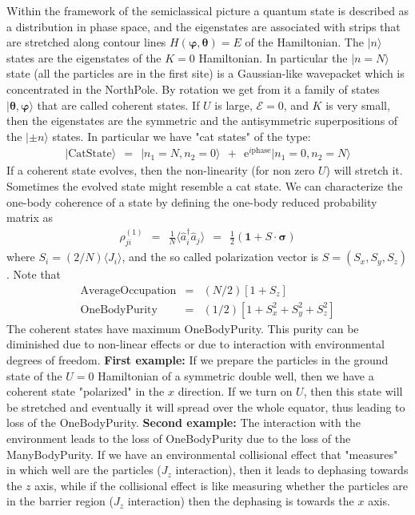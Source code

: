 \documentclass[onecolumn,fleqn, 11pt]{revtex4}
\newcommand{\eexp}{\mathrm{e}^}
\newcommand{\varphiJ}{\bm{\varphi}}
\newcommand{\thetaJ}{\bm{\theta}}
\newcommand{\beq}{\begin{eqnarray}}
\newcommand{\eeq}{\end{eqnarray}}
\begin{document}
Within the framework of the semiclassical picture 
a quantum state is described as a distribution 
in phase space, and the eigenstates are associated 
with strips that are stretched along 
contour lines ${H(\varphiJ,\thetaJ)=E}$ of the Hamiltonian. 
The $|n\rangle$ states are the eigenstates of the $K=0$ Hamiltonian. 
In particular the ${|n{=}N\rangle}$ state (all the particles are in the first site) 
is a Gaussian-like wavepacket which is concentrated in the NorthPole. 
By rotation we get from it a family of states ${|\thetaJ,\varphiJ\rangle}$
that are called coherent states. 
If $U$ is large, $\mathcal{E}=0$, and $K$ is very small, 
then the eigenstates are the symmetric and the antisymmetric 
superpositions of the $|\pm n\rangle$ states.  
In particular we have "cat states" of the type:
\beq
| \mbox{CatState} \rangle \ \ = \ \ |n_1{=}N,n_2{=}0\rangle \ \ + \ \ \eexp{i\mbox{phase}} |n_1{=}0,n_2{=}N\rangle 
\eeq
If a coherent state evolves, then the non-linearity (for non zero $U$) 
will stretch it. Sometimes the evolved state might resemble a cat state.
We can characterize the one-body coherence of a state 
by defining the one-body reduced probability matrix as 
\beq
\rho^{(1)}_{ji} 
\ \ = \ \  \frac{1}{N}\langle \hat{a}_i^{\dagger} \hat{a}_j \rangle   
\ \ = \ \  \frac{1}{2}(\bm{1} +  S \cdot \bm{\sigma}) 
\eeq
where  ${S_i=(2/N)\langle J_i \rangle}$, and the so called polarization vector 
is ${S = ( S_x,  S_y, S_z)}$. Note that
\beq
\mbox{AverageOccupation} &=& (N/2)\left[ 1 + S_z \right]
\\
\mbox{OneBodyPurity} &=&  (1/2) \left[ 1 + S_x^2 + S_y^2 + S_z^2 \right]
\eeq
The coherent states have maximum OneBodyPurity. 
This purity can be diminished due to 
non-linear effects or due to interaction 
with environmental degrees of freedom.  
{\bf First example:} 
If we prepare the particles in the ground state 
of the ${U=0}$ Hamiltonian of a symmetric double well, 
then we have a coherent state "polarized" in the $x$ direction.
If we turn on $U$, then this state will be stretched 
and eventually it will spread over the whole equator, 
thus leading to loss of the OneBodyPurity.
{\bf Second example:} 
The interaction with the environment leads 
to the loss of OneBodyPurity due to the loss of the ManyBodyPurity. 
If we have an environmental collisional effect that 
"measures" in which well are the particles ($J_z$ interaction), 
then it leads to dephasing towards the $z$ axis, 
while if the collisional effect is like measuring whether 
the particles are in the barrier region  ($J_z$ interaction) 
then the dephasing is towards the $x$ axis. 
\end{document}
